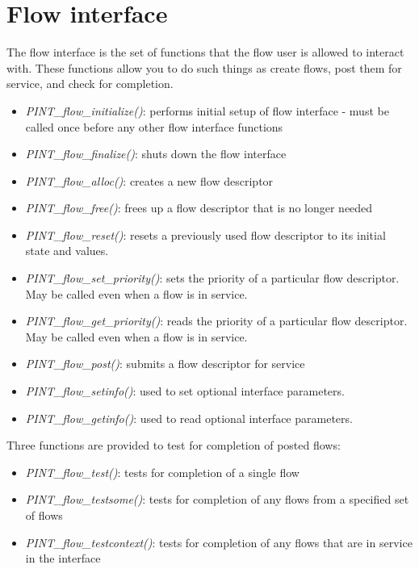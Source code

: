 \documentclass[12pt]{article} %
\begin{document}
\section{Flow interface}

The flow interface is the set of functions that the flow user is allowed
to interact with.  These functions allow you to do such things as create
flows, post them for service, and check for completion.

\begin{itemize}
	\item \emph{PINT\_flow\_initialize()}: performs initial setup of flow
	interface - must be called once before any other flow interface functions
	\item \emph{PINT\_flow\_finalize()}: shuts down the flow interface
	\item \emph{PINT\_flow\_alloc()}: creates a new flow descriptor
	\item \emph{PINT\_flow\_free()}: frees up a flow descriptor that is
	no longer needed
	\item \emph{PINT\_flow\_reset()}: resets a previously used flow
	descriptor to its initial state and values.
	\item \emph{PINT\_flow\_set\_priority()}: sets the priority of a
	particular flow descriptor.  May be called even when a flow is in
	service.
	\item \emph{PINT\_flow\_get\_priority()}: reads the priority of a
	particular flow descriptor.  May be called even when a flow is in
	service.
	\item \emph{PINT\_flow\_post()}: submits a flow descriptor for
	service
	\item \emph{PINT\_flow\_setinfo()}: used to set optional
	interface parameters.
	\item \emph{PINT\_flow\_getinfo()}: used to read optional
	interface parameters.
\end{itemize}

Three functions are provided to test for completion of posted flows:

\begin{itemize}
	\item \emph{PINT\_flow\_test()}: tests for completion of a single
	flow
	\item \emph{PINT\_flow\_testsome()}: tests for completion of any
   flows from a specified set of flows
	\item \emph{PINT\_flow\_testcontext()}: tests for completion of any
	flows that are in service in the interface 
\end{itemize}
\end{document}
